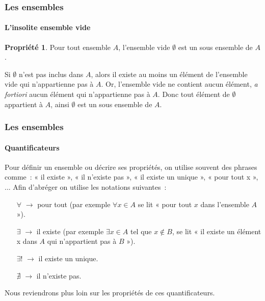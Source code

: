 \documentclass[10pt,notheorems]{beamer}
\theoremstyle{plain}
\theoremstyle{definition} %
\newtheorem{property}[properties]{Propriété}
\begin{document}
\begin{frame}
  \frametitle{Les ensembles}
  \framesubtitle{L'insolite ensemble vide}
  \hypertarget{slide_ensemble_vide_1}{}


  \begin{property}
    Pour tout ensemble $A$, l'ensemble vide $\emptyset$ est un sous ensemble de $A$.
  \end{property}

  \bigskip\bigskip

  Si $\emptyset$ n'est pas inclus dans $A$, alors il existe au moins
  un élément de l'ensemble vide qui n'appartienne pas à $A$. Or,
  l'ensemble vide ne contient aucun élément, \textit{a fortiori} aucun
  élément qui n'appartienne pas à $A$. Donc tout élément de
  $\emptyset$ appartient à $A$, ainsi $\emptyset$ est un sous ensemble
  de $A$.
\end{frame}


\begin{frame}
  \frametitle{Les ensembles}
  \framesubtitle{Quantificateurs}
  \hypertarget{quantificateurs_notations}{}


  Pour définir un ensemble ou décrire ses propriétés, on utilise souvent des phrases comme~: « il existe », « il n'existe pas », « il existe un unique », « pour tout x », ... Afin  d'abréger on utilise les notations suivantes :\newline

  \begin{itemize}

  \item[$\forall$] $\rightarrow$ pour tout (par exemple $\forall x \in A$ se lit « pour tout $x$ dans l'ensemble $A$ »).\newline

  \item[$\exists$] $\rightarrow$ il existe (par exemple $\exists x\in A$ tel que $x\notin B$, se lit « il existe un élément x dans $A$ qui n'appartient pas à $B$ »).\newline

  \item[$\exists!$] $\rightarrow$ il existe un unique.\newline

  \item[$\nexists$] $\rightarrow$ il n'existe pas.\newline

  \end{itemize}

  Nous reviendrons plus loin sur les propriétés de ces quantificateurs.

\end{frame}
\end{document}
